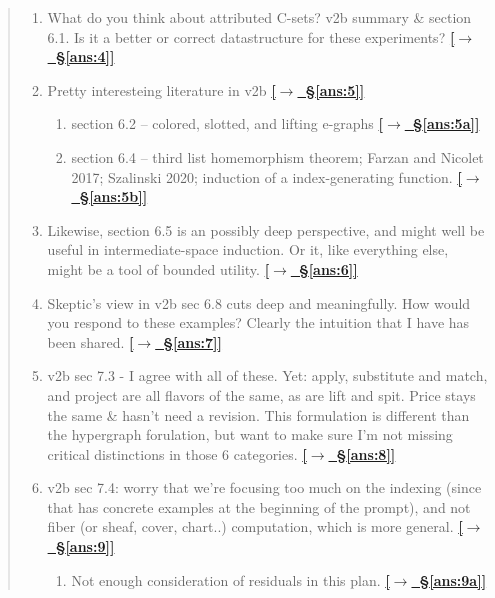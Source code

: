\documentclass[12pt]{article}
\newcommand{\qtoans}[2]{\hyperref[#1]{\textcolor{qpurple}{\textbf{\small[\(\rightarrow\)~#2]}}}}
\begin{document}
\begin{quote}
\begin{enumerate}[label=\arabic*., leftmargin=1.8em, itemsep=0.25em]
  \item \hypertarget{q:4}{}What do you think about attributed C-sets? v2b summary \& section 6.1. Is it a better or correct datastructure for these experiments? \qtoans{ans:4}{\S\ref{ans:4}}

  \item \hypertarget{q:5}{}Pretty interesteing literature in v2b \qtoans{ans:5}{\S\ref{ans:5}}
  \begin{enumerate}[label=\alph*., leftmargin=1.6em, itemsep=0.15em]
    \item \hypertarget{q:5a}{}section 6.2 -- colored, slotted, and lifting e-graphs \qtoans{ans:5a}{\S\ref{ans:5a}}
    \item \hypertarget{q:5b}{}section 6.4 -- third list homemorphism theorem; Farzan and Nicolet 2017; Szalinski 2020; induction of a index-generating function. \qtoans{ans:5b}{\S\ref{ans:5b}}
  \end{enumerate}

  \item \hypertarget{q:6}{}Likewise, section 6.5 is an possibly deep perspective, and might well be useful in intermediate-space induction. Or it, like everything else, might be a tool of bounded utility. \qtoans{ans:6}{\S\ref{ans:6}}

  \item \hypertarget{q:7}{}Skeptic's view in v2b sec 6.8 cuts deep and meaningfully. How would you respond to these examples? Clearly the intuition that I have has been shared. \qtoans{ans:7}{\S\ref{ans:7}}

  \item \hypertarget{q:8}{}v2b sec 7.3 - I agree with all of these. Yet: apply, substitute and match, and project are all flavors of the same, as are lift and spit. Price stays the same \& hasn't need a revision. This formulation is different than the hypergraph forulation, but want to make sure I'm not missing critical distinctions in those 6 categories. \qtoans{ans:8}{\S\ref{ans:8}}

  \item \hypertarget{q:9}{}v2b sec 7.4: worry that we're focusing too much on the indexing (since that has concrete examples at the beginning of the prompt), and not fiber (or sheaf, cover, chart..) computation, which is more general. \qtoans{ans:9}{\S\ref{ans:9}}
  \begin{enumerate}[label=\alph*., leftmargin=1.6em]
    \item \hypertarget{q:9a}{}Not enough consideration of residuals in this plan. \qtoans{ans:9a}{\S\ref{ans:9a}}
  \end{enumerate}


\end{enumerate}
\end{quote}
\end{document}
